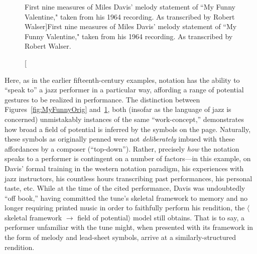         \begin{figure}
            \centering
            \captionsetup{width=.5\textwidth}
            \caption[First nine measures of Miles Davis' melody statement of ``My Funny Valentine," taken from his 1964 recording. As transcribed by Robert Walser]{First nine measures of Miles Davis' melody statement of ``My Funny Valentine," taken from his 1964 recording. As transcribed by Robert Walser.\footnotemark}
            \label{fig:MyFunnyDavis}
        \end{figure}

    Here, as in the earlier fifteenth-century examples, notation has the ability to ``speak to'' a jazz performer in a particular way, affording a range of potential gestures to be realized in performance. The distinction between Figures~\ref{fig:MyFunnyOrig} and~\ref{fig:MyFunnyDavis}, both (insofar as the language of jazz is concerned) unmistakably instances of the same ``work-concept,'' demonstrates how broad a field of potential is inferred by the symbols on the page. Naturally, these symbols as originally penned were not \textit{deliberately} imbued with these affordances by a composer (``top-down''). Rather, precisely \textit{how} the notation speaks to a performer is contingent on a number of factors---in this example, on Davis' formal training in the western notation paradigm, his experiences with jazz instructors, his countless hours transcribing past performances, his personal taste, etc. While at the time of the cited performance, Davis was undoubtedly ``off book,'' having committed the tune's skeletal framework to memory and no longer requiring printed music in order to faithfully perform his rendition, the $\langle$skeletal framework $\rightarrow$ field of potential$\rangle$ model still obtains. That is to say, a performer unfamiliar with the tune might, when presented with its framework in the form of melody and lead-sheet symbols, arrive at a similarly-structured rendition.


